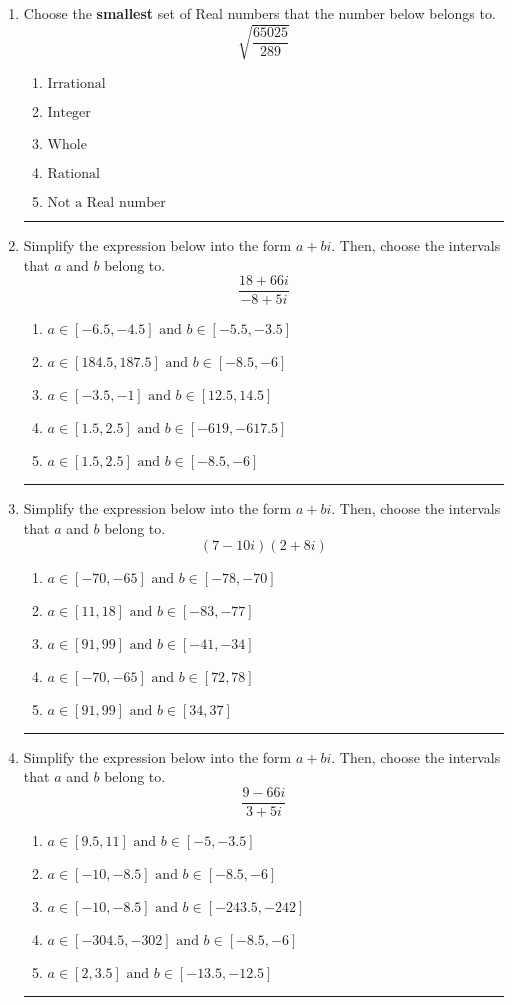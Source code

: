 \documentclass[14pt]{extbook}
\newcommand{\litem}[1]{\item#1\hspace*{-1cm}\rule{\textwidth}{0.4pt}}
\begin{document}
\begin{enumerate}
{\begin{enumerate}[label=\Alph*.]
\end{enumerate} }
\litem{
Choose the \textbf{smallest} set of Real numbers that the number below belongs to.\[ \sqrt{\frac{65025}{289}} \]\begin{enumerate}[label=\Alph*.]
\item \( \text{Irrational} \)
\item \( \text{Integer} \)
\item \( \text{Whole} \)
\item \( \text{Rational} \)
\item \( \text{Not a Real number} \)

\end{enumerate} }
\litem{
Simplify the expression below into the form $a+bi$. Then, choose the intervals that $a$ and $b$ belong to.\[ \frac{18 + 66 i}{-8 + 5 i} \]\begin{enumerate}[label=\Alph*.]
\item \( a \in [-6.5, -4.5] \text{ and } b \in [-5.5, -3.5] \)
\item \( a \in [184.5, 187.5] \text{ and } b \in [-8.5, -6] \)
\item \( a \in [-3.5, -1] \text{ and } b \in [12.5, 14.5] \)
\item \( a \in [1.5, 2.5] \text{ and } b \in [-619, -617.5] \)
\item \( a \in [1.5, 2.5] \text{ and } b \in [-8.5, -6] \)

\end{enumerate} }
\litem{
Simplify the expression below into the form $a+bi$. Then, choose the intervals that $a$ and $b$ belong to.\[ (7 - 10 i)(2 + 8 i) \]\begin{enumerate}[label=\Alph*.]
\item \( a \in [-70, -65] \text{ and } b \in [-78, -70] \)
\item \( a \in [11, 18] \text{ and } b \in [-83, -77] \)
\item \( a \in [91, 99] \text{ and } b \in [-41, -34] \)
\item \( a \in [-70, -65] \text{ and } b \in [72, 78] \)
\item \( a \in [91, 99] \text{ and } b \in [34, 37] \)

\end{enumerate} }
\litem{
Simplify the expression below into the form $a+bi$. Then, choose the intervals that $a$ and $b$ belong to.\[ \frac{9 - 66 i}{3 + 5 i} \]\begin{enumerate}[label=\Alph*.]
\item \( a \in [9.5, 11] \text{ and } b \in [-5, -3.5] \)
\item \( a \in [-10, -8.5] \text{ and } b \in [-8.5, -6] \)
\item \( a \in [-10, -8.5] \text{ and } b \in [-243.5, -242] \)
\item \( a \in [-304.5, -302] \text{ and } b \in [-8.5, -6] \)
\item \( a \in [2, 3.5] \text{ and } b \in [-13.5, -12.5] \)


\end{enumerate}}
\end{enumerate}
\end{document}
